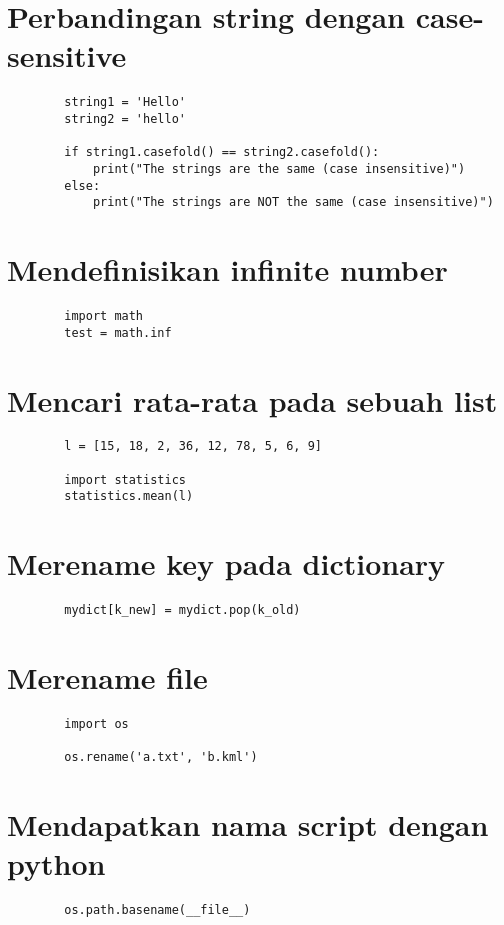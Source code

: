 \documentclass{article}
\begin{document}
	\section {Perbandingan string dengan case-sensitive}
	\begin{lstlisting}
		string1 = 'Hello'
		string2 = 'hello'
		
		if string1.casefold() == string2.casefold():
			print("The strings are the same (case insensitive)")
		else:
			print("The strings are NOT the same (case insensitive)")
	\end{lstlisting}

	\section {Mendefinisikan infinite number}
	\begin{lstlisting}
		import math
		test = math.inf
	\end{lstlisting}

	\section {Mencari rata-rata pada sebuah list}
	\begin{lstlisting}
		l = [15, 18, 2, 36, 12, 78, 5, 6, 9]
		
		import statistics
		statistics.mean(l)
	\end{lstlisting}

	\section {Merename key pada dictionary}
	\begin{lstlisting}
		mydict[k_new] = mydict.pop(k_old)
	\end{lstlisting}

	\section {Merename file}
	\begin{lstlisting}
		import os
		
		os.rename('a.txt', 'b.kml')
	\end{lstlisting}

	\section {Mendapatkan nama script dengan python}
	\begin{lstlisting}
		os.path.basename(__file__)
	\end{lstlisting}
\end{document}
